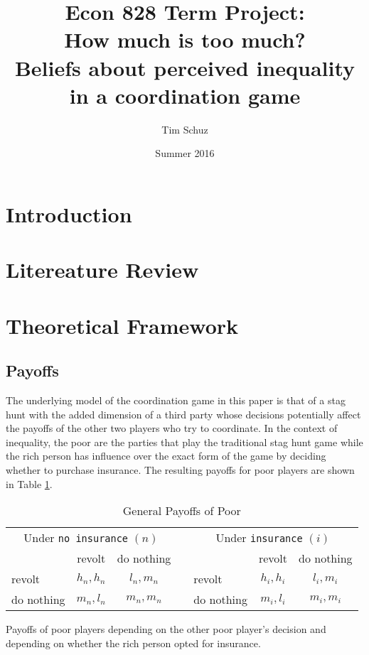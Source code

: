 \documentclass[12pt]{article}
\title{Econ 828 Term Project:\\ How much is too much?\\
		Beliefs about perceived inequality in a coordination game}
\author{Tim Schuz}
\date{Summer 2016}
\begin{document}
	\maketitle
	\doublespacing
	\section{Introduction}
	\section{Litereature Review}
	\section{Theoretical Framework}
	\subsection{Payoffs}
	The underlying model of the coordination game in this paper is that of a stag hunt with the added dimension of a third party whose decisions potentially affect the payoffs of the other two players who try to coordinate. In the context of inequality, the poor are the parties that play the traditional stag hunt game while the rich person has influence over the exact form of the game by deciding whether to purchase insurance. The resulting payoffs for poor players are shown in Table \ref{gpayoff}.
	
	\begin{table}[!htbp]
		\caption{General Payoffs of Poor}
		\label{gpayoff}
		\begin{center}
		\begin{tabular}{|l|c|c|c|l|c|c|}
			\multicolumn{3}{c}{Under \texttt{no insurance} $(n)$} &
			\multicolumn{1}{c}{} &
			\multicolumn{3}{c}{Under \texttt{insurance} $(i)$}\\
			\cline{1-3}\cline{5-7}
			& revolt & do nothing & & & revolt & do nothing\\
			\cline{1-3}\cline{5-7}
			revolt & $h_n, h_n$ & $l_n, m_n$ && revolt & $h_i, h_i$ & $l_i, m_i$\\
			\cline{1-3}\cline{5-7}
			do nothing & $m_n, l_n$ & $m_n, m_n$ && do nothing & $m_i, l_i$ & $m_i, m_i$\\
			\cline{1-3}\cline{5-7}
		\end{tabular}
		\end{center}
		\footnotesize
		Payoffs of poor players depending on the other poor player's decision and depending on whether the rich person opted for insurance. 
	\end{table}
	
\end{document}
